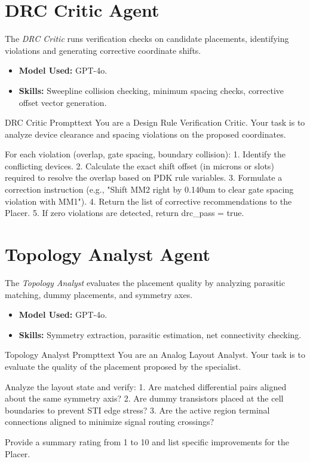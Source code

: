 \section{DRC Critic Agent}
\noindent
The \textit{DRC Critic} runs verification checks on candidate placements, identifying violations and generating corrective coordinate shifts.
\begin{itemize}
    \item \textbf{Model Used:} GPT-4o.
    \item \textbf{Skills:} Sweepline collision checking, minimum spacing checks, corrective offset vector generation.
\end{itemize}
\begin{thesiscode}{DRC Critic Prompt}{text}
You are a Design Rule Verification Critic.
Your task is to analyze device clearance and spacing violations on the proposed coordinates.

For each violation (overlap, gate spacing, boundary collision):
1. Identify the conflicting devices.
2. Calculate the exact shift offset (in microns or slots) required to resolve the overlap based on PDK rule variables.
3. Formulate a correction instruction (e.g., "Shift MM2 right by 0.140um to clear gate spacing violation with MM1").
4. Return the list of corrective recommendations to the Placer.
5. If zero violations are detected, return drc_pass = true.
\end{thesiscode}

\section{Topology Analyst Agent}
\noindent
The \textit{Topology Analyst} evaluates the placement quality by analyzing parasitic matching, dummy placements, and symmetry axes.
\begin{itemize}
    \item \textbf{Model Used:} GPT-4o.
    \item \textbf{Skills:} Symmetry extraction, parasitic estimation, net connectivity checking.
\end{itemize}
\begin{thesiscode}{Topology Analyst Prompt}{text}
You are an Analog Layout Analyst.
Your task is to evaluate the quality of the placement proposed by the specialist.

Analyze the layout state and verify:
1. Are matched differential pairs aligned about the same symmetry axis?
2. Are dummy transistors placed at the cell boundaries to prevent STI edge stress?
3. Are the active region terminal connections aligned to minimize signal routing crossings?

Provide a summary rating from 1 to 10 and list specific improvements for the Placer.
\end{thesiscode}

